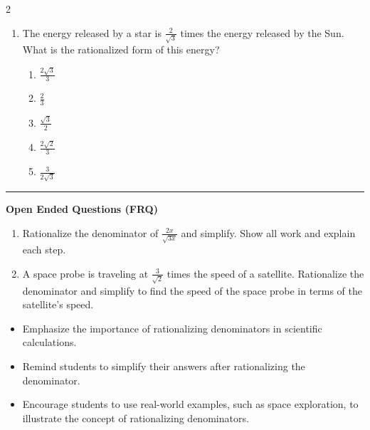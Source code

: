\documentclass[10pt]{article}
\begin{document}
\begin{multicols}{2}
\begin{enumerate}[label=\textbf{Q\arabic*.}, leftmargin=*, itemsep=6pt, parsep=0pt]
  \item \small The energy released by a star is $\frac{2}{\sqrt{3}}$ times the energy released by the Sun. What is the rationalized form of this energy?
  \begin{enumerate}[label=(\Alph*), leftmargin=0.6cm, nosep, itemsep=2pt]
    \item $\frac{2\sqrt{3}}{3}$
    \item $\frac{2}{3}$
    \item $\frac{\sqrt{3}}{2}$
    \item $\frac{2\sqrt{2}}{3}$
    \item $\frac{3}{2\sqrt{3}}$
  \end{enumerate}

\end{enumerate}
\end{multicols}

\vspace{-0.2cm}
\hrule
\vspace{0.2cm}
\textbf{\small Open Ended Questions (FRQ)}
\begin{enumerate}[label=\textbf{Q\arabic*.}, start=9, itemsep=5pt, topsep=0pt]

  \item \small Rationalize the denominator of $\frac{2x}{\sqrt{3x}}$ and simplify. Show all work and explain each step. \vspace{2cm}

  \item \small A space probe is traveling at $\frac{3}{\sqrt{2}}$ times the speed of a satellite. Rationalize the denominator and simplify to find the speed of the space probe in terms of the satellite's speed. \vspace{2cm}

\end{enumerate}

\vfill

\begin{tcolorbox}[colback=blue!5, colframe=mainblue!50, title=\small \textbf{Chef's Tips}, fonttitle=\bfseries, bottom=1mm]
\begin{itemize}[noitemsep, topsep=2pt, leftmargin=0.5cm]
  \item \scriptsize Emphasize the importance of rationalizing denominators in scientific calculations.\item \scriptsize Remind students to simplify their answers after rationalizing the denominator.\item \scriptsize Encourage students to use real-world examples, such as space exploration, to illustrate the concept of rationalizing denominators.
\end{itemize}
\end{tcolorbox}
\end{document}
